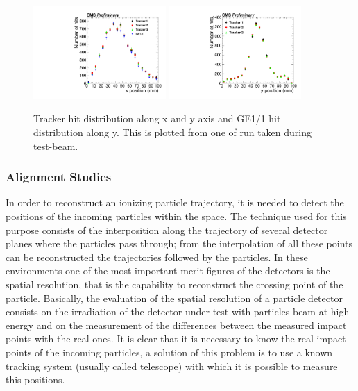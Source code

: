 \begin{figure}[!htbp]
\centering
\includegraphics[width=0.45\textwidth]{figures/GEM/Tracker_Hit_position_Run1644_x.pdf}%
\includegraphics[width=0.45\textwidth]{figures/GEM/Tracker_Hit_position_Run1644_y.pdf}
\caption{Tracker hit distribution along x and y axis and GE1/1 hit distribution along y. This is plotted from one of run taken during test-beam.}
\label{HitPosXaxis}
\end{figure}

\subsubsection{Alignment Studies}

In order to reconstruct an ionizing particle trajectory, it is needed to detect the positions of the incoming particles within the space. 
The technique used for this purpose consists of the interposition along the trajectory of several detector planes where the particles pass through; from the interpolation of all these points can be reconstructed the trajectories followed by the particles.
In these environments one of the most important merit figures of the detectors is the spatial resolution, that is the capability to reconstruct the crossing point of the particle.
Basically, the evaluation of the spatial resolution of a particle detector consists on the irradiation of the detector under test with particles beam at high energy and on the measurement of the differences between the measured impact points with the real ones.
It is clear that it is necessary to know the real impact points of the incoming particles, a solution of this problem is to use a known tracking system (usually called telescope) with which it is possible to measure this positions.

